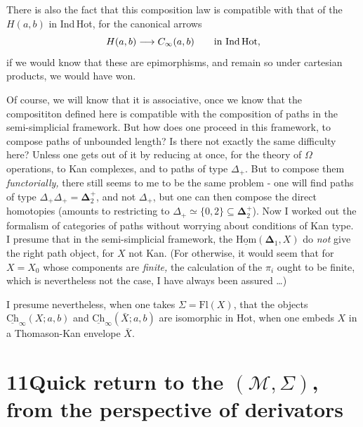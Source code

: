 \documentclass[11pt]{article}
\newcommand{\printedpage}[1]{\marginpar{\footnotesize p.~#1}}
\newcommand{\msp}[1]{\marginpar{\footnotesize [#1]}}
\newcommand{\Ch}{\underline{\mathrm{Ch}}}
\newcommand{\uHom}{\underline{\mathrm{Hom}}}
\begin{document}
\clearpage
\printedpage{80}

There is also the fact that this composition law is compatible with that of the $H(a,b)$ in Ind\,Hot, for the canonical arrows
\[ H(a,b)\longrightarrow C_\infty(a,b) \qquad \text{in Ind\,Hot}, \]
if we would know that these are epimorphisms, and remain so under cartesian products, we would have won.

Of course, we will know that it is associative, once we know that the composititon defined here is compatible with the composition of paths in the semi-simplicial framework. But how does one proceed in this framework, to compose paths of unbounded length? Is there not exactly the same difficulty here? Unless one gets %
\msp{page 128}
out of it by reducing at once, for the theory of $\Omega$ operations, to Kan complexes, and to paths of type $\Delta_+$. But to compose them \textit{functorially,} there still seems to me to be the same problem - one will find paths of type $\Delta_+\Delta_+ = \boldsymbol{\Delta}_2^+$, and not $\Delta_+$, but one can then compose the direct homotopies (amounts to restricting to $\Delta_+\simeq\{0,2\}\subseteq\boldsymbol{\Delta}_2^+$). Now I worked out the formalism of categories of paths without worrying about conditions of Kan type. I presume that in the semi-simplicial framework, the $\uHom(\boldsymbol{\Delta}_1,X)$ do \textit{not} give the right path object, for $X$ not Kan. (For otherwise, it would seem that for $X=X_0$ whose components are \textit{finite,} the calculation of the $\pi_i$ ought to be finite, which is nevertheless not the case, I have always been assured \dots)

I presume nevertheless, when one takes $\Sigma=\mathrm{Fl}(X)$, that the objects $\Ch_\infty(X;a,b)$ and $\Ch_\infty(\bar{X};a,b)$ are isomorphic in Hot, when one embeds $X$ in a Thomason-Kan envelope $\bar{X}$.

\clearpage
\printedpage{81}

\msp{page 129}

\section*{11\quad Quick return to the $(\mathcal{M},\Sigma)$, from the perspective of derivators}
\end{document}
